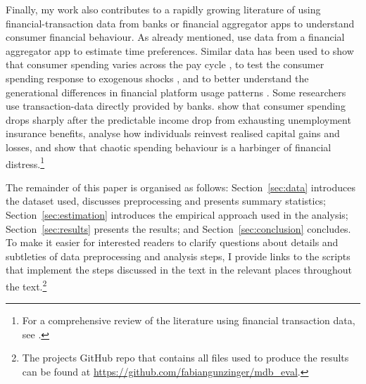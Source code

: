 Finally, my work also contributes to a rapidly growing literature of using
financial-transaction data from banks or financial aggregator apps to
understand consumer financial behaviour. As already mentioned,
\citet{kuchler2020sticking} use data from a financial aggregator app to
estimate time preferences. Similar data has been used to show that consumer
spending varies across the pay cycle
\citep{gelman2014harnessing,olafsson2018liquid}, to test the consumer spending
response to exogenous shocks \citep{baker2018debt,baugh2014disentangling}, and
to better understand the generational differences in financial platform usage
patterns \citep{carlin2019generational}. Some researchers use transaction-data
directly provided by banks. \citet{ganong2019consumer} show that consumer
spending drops sharply after the predictable income drop from exhausting
unemployment insurance benefits, \citet{meyer2018fully} analyse how individuals
reinvest realised capital gains and losses, and \citet{muggleton2020evidence}
show that chaotic spending behaviour is a harbinger of financial
distress.\footnote{For a comprehensive review of the literature using financial
transaction data, see \citet{baker2022household}.}


The remainder of this paper is organised as follows: Section~\ref{sec:data}
introduces the dataset used, discusses preprocessing and presents summary
statistics; Section~\ref{sec:estimation} introduces the empirical approach used
in the analysis; Section~\ref{sec:results} presents the results; and
Section~\ref{sec:conclusion} concludes. To make it easier for interested
readers to clarify questions about details and subtleties of data preprocessing
and analysis steps, I provide links to the scripts that implement the steps
discussed in the text in the relevant places throughout the text.\footnote{The
    projects GitHub repo that contains all files used to produce the results
    can be found at
\href{https://github.com/fabiangunzinger/mdb\_eval}{https://github.com/fabiangunzinger/mdb\_eval}.}

